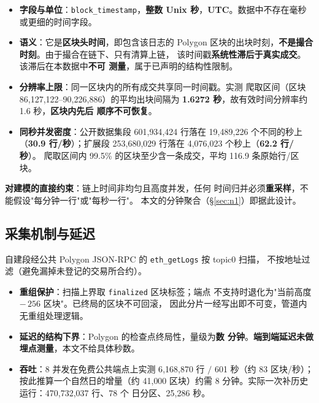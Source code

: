 \documentclass[11pt, a4paper]{ctexart}
\newcommand{\code}[1]{\texttt{\small #1}}
\begin{document}
\begin{itemize}
\item \textbf{字段与单位}：\code{block\_timestamp}，\textbf{整数 Unix
  秒}，\textbf{UTC}。数据中不存在毫秒或更细的时间字段。
\item \textbf{语义}：它是\textbf{区块头时间}，即包含该日志的 Polygon
  区块的出块时刻，\textbf{不是撮合时刻}。由于撮合在链下、只有清算上链，
  该时间戳\textbf{系统性滞后于真实成交}。该滞后在本数据中\textbf{不可
  测量}，属于已声明的结构性限制。
\item \textbf{分辨率上限}：同一区块内的所有成交共享同一时间戳。实测
  爬取区间（区块 86{,}127{,}122--90{,}226{,}886）的平均出块间隔为
  \textbf{1.6272 秒}，故有效时间分辨率约 1.6 秒，\textbf{区块内先后
  顺序不可恢复}。
\item \textbf{同秒并发密度}：公开数据集段 601{,}934{,}424 行落在
  19{,}489{,}226 个不同的秒上（\textbf{30.9 行/秒}）；扩展段
  253{,}680{,}029 行落在 4{,}076{,}023 个秒上（\textbf{62.2 行/秒}）。
  爬取区间内 99.5\% 的区块至少含一条成交，平均 116.9 条原始行/区块。
\end{itemize}

\noindent\textbf{对建模的直接约束}：链上时间非均匀且高度并发，任何
时间归并必须\textbf{重采样}，不能假设"每分钟一行"或"每秒一行"。
本文的分钟聚合（\S\ref{sec:n1}）即据此设计。

\subsection{采集机制与延迟}\label{sec:latency}

自建段经公共 Polygon JSON-RPC 的 \code{eth\_getLogs} 按 topic0 扫描，
不按地址过滤（避免漏掉未登记的交易所合约）。

\begin{itemize}
\item \textbf{重组保护}：扫描上界取 \code{finalized} 区块标签；端点
  不支持时退化为"当前高度 $-\,256$ 区块"。已终局的区块不可回滚，
  因此分片一经写出即不可变，管道内无重组处理逻辑。
\item \textbf{延迟的结构下界}：Polygon 的检查点终局性，量级为\textbf{数
  分钟}。\textbf{端到端延迟未做埋点测量}，本文不给具体秒数。
\item \textbf{吞吐}：8 并发在免费公共端点上实测 6{,}168{,}870 行
  $/$ 601 秒（约 83 区块/秒）；按此推算一个自然日的增量（约 41{,}000
  区块）约需 8 分钟。实际一次补历史运行：470{,}732{,}037 行、78 个
  日分区、25{,}286 秒。
\end{itemize}
\end{document}

